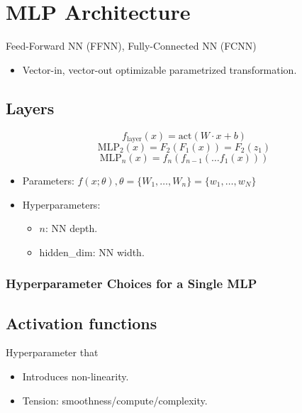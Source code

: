 \section{MLP Architecture}
\begin{definition}
    Feed-Forward NN (FFNN), Fully-Connected NN (FCNN)
    \begin{itemize}
        \item Vector-in, vector-out optimizable parametrized transformation. 
    \end{itemize}
\end{definition}

\subsection{Layers}
\begin{definition}
    \begin{equation*}
        f_{\text{layer}}(x) = \text{act}(W \cdot x + b)
    \end{equation*}
    \begin{equation*}
        \text{MLP}_2(x) = F_2(F_1(x)) = F_2(z_1)
    \end{equation*}
    \begin{equation*}
        \text{MLP}_n(x) = f_n(f_{n-1}(\dots f_1(x)))
    \end{equation*}

    \begin{itemize}
        \item Parameters: $f(x; \theta), \theta = \{W_1, \dots, W_n\} = \{w_1, \dots, w_N\}$
        \item Hyperparameters: 
        \begin{itemize}
            \item $n$: NN depth.
            \item hidden\_dim: NN width.
        \end{itemize}
    \end{itemize}
\end{definition}

\subsubsection{Hyperparameter Choices for a Single MLP}
\begin{notes}
\end{notes}

\subsection{Activation functions}
\begin{definition}
    Hyperparameter that 
    \begin{itemize}
        \item Introduces non-linearity.
        \item Tension: smoothness/compute/complexity.
    \end{itemize}
\end{definition}

